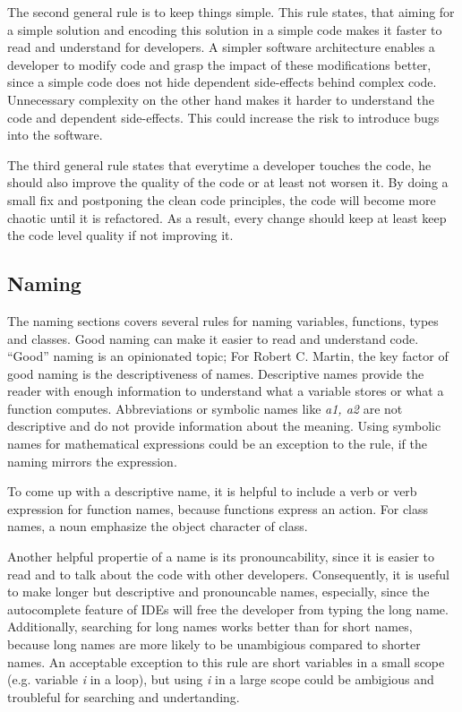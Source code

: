 The second general rule is to keep things simple. This rule states, that aiming for a simple solution and encoding this solution in a simple code makes it faster to read and understand for developers.
A simpler software architecture enables a developer to modify code and grasp the impact of these modifications better, since a simple code does not hide dependent side-effects behind complex code. Unnecessary complexity on the other hand makes it harder to understand the code and dependent side-effects. This could increase the risk to introduce bugs into the software.

The third general rule states that everytime a developer touches the code, he should also improve the quality of the code or at least not worsen it. By doing a small fix and postponing the clean code principles, the code will become more chaotic until it is refactored. As a result, every change should keep at least keep the code level quality if not improving it.  

\subsection{Naming}\label{sec:naming}
The naming sections covers several rules for naming variables, functions, types and classes.
Good naming can make it easier to read and understand code. \enquote{Good} naming is an opinionated topic; For Robert C. Martin, the key factor of good naming is the descriptiveness of names\cite{martin_clean_2009}. Descriptive names provide the reader with enough information to understand what a variable stores or what a function computes. Abbreviations or symbolic names like \textit{a1, a2} are not descriptive and do not provide information about the meaning. Using symbolic names for mathematical expressions could be an exception to the rule, if the naming mirrors the expression.

To come up with a descriptive name, it is helpful to include a verb or verb expression for function names, because functions express an action. For class names, a noun emphasize the object character of class.

Another helpful propertie of a name is its pronouncability, since it is easier to read and to talk about the code with other developers. Consequently, it is useful to make longer but descriptive and pronouncable names, especially, since the autocomplete feature of IDEs will free the developer from typing the long name. Additionally, searching for long names works better than for short names, because long names are more likely to be unambigious compared to shorter names. An acceptable exception to this rule are short variables in a small scope (e.g. variable \textit{i} in a loop), but using \textit{i} in a large scope could be ambigious and troubleful for searching and undertanding.

